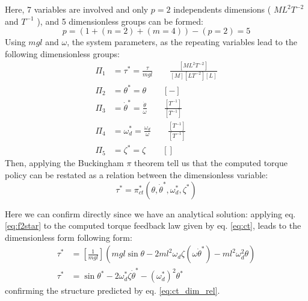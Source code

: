 Here, 7 variables are involved and only $p=2$ independents dimensions ( $ML^2T^{-2}$ and $T^{-1}$ ), and 5 dimensionless groups can be formed:
\begin{equation}
p = ( 1 + (n=2) + (m=4)) - ( p = 2 ) = 5
\end{equation}
Using $mgl$ and $\omega$, the system parameters, as the repeating variables lead to the following dimensionless groups:
\begin{align}
\Pi_1 &= \tau^* = \frac{\tau}{mgl} \quad \quad \frac{[ML^2T^{-2}]}{[M][LT^{-2}][L]} \\
\Pi_2 &= \theta^* = \theta \quad \quad [-]\\
\Pi_3 &= \dot{\theta}^* = \frac{ \dot{\theta}  }{ \omega } \quad \quad \frac{[T^{-1}]}{[T^{-1}]} \\
\Pi_4 &= \omega_d^* = \frac{\omega_d}{\omega} \quad \quad \frac{[T^{-1}]}{[T^{-1}]} \\
\Pi_5 &= \zeta^* = \zeta \quad \quad []
\end{align}
Then, applying the Buckingham $\pi$ theorem tell us that the computed torque policy can be restated as a relation between the dimensionless variable:
\begin{equation}
\tau^*
=
\pi^*_{ct} \left(
\theta, \dot{\theta}^*,
\omega_d^* , \zeta^* 
\right)
\label{eq:ct_dim_rel}
\end{equation}

Here we can confirm directly since we have an analytical solution: applying eq. \eqref{eq:f2star} to the computed torque feedback law given by eq. \eqref{eq:ct}, leads to the dimensionless form following form:
\begin{align}
\tau^* &= \left[ \frac{1}{mgl} \right] \left( mgl \sin \theta - 2 m l^2 \omega_d \zeta \left( \omega \dot{\theta}^*\right) - m l^2 \omega_d^2 \theta \right) \\
\tau^*
&=
\sin \theta^*
- 2 \omega_d^* \zeta \dot{\theta}^* 
- (\omega_d^*)^2 \theta^*
\end{align}
confirming the structure predicted by eq. \eqref{eq:ct_dim_rel}.

